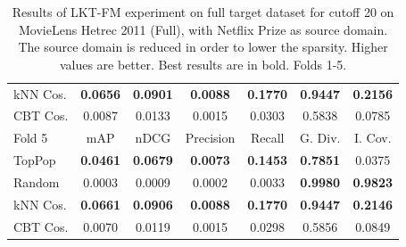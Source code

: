 \begin{table}[hbt]
\begin{tabulary}{\textwidth}{|L|CCCCCC|}
kNN Cos. & \textbf{0.0656} & \textbf{0.0901} & \textbf{0.0088} & \textbf{0.1770} & \textbf{0.9447} & \textbf{0.2156} \\
CBT Cos. & 0.0087 & 0.0133 & 0.0015 & 0.0303 & 0.5838 & 0.0785 \\
\hline
\hline
Fold 5 & mAP & nDCG & Precision & Recall & G. Div. & I. Cov. \\
\hline
TopPop & \textbf{0.0461} & \textbf{0.0679} & \textbf{0.0073} & \textbf{0.1453} & \textbf{0.7851} & 0.0375 \\
Random & 0.0003 & 0.0009 & 0.0002 & 0.0033 & \textbf{0.9980} & \textbf{0.9823} \\
kNN Cos. & \textbf{0.0661} & \textbf{0.0906} & \textbf{0.0088} & \textbf{0.1770} & \textbf{0.9447} & \textbf{0.2146} \\
CBT Cos. & 0.0070 & 0.0119 & 0.0015 & 0.0298 & 0.5856 & 0.0849 \\
\hline
\end{tabulary}
\caption{Results of LKT-FM experiment on full target dataset for cutoff 20 on MovieLens Hetrec 2011 (Full), with Netflix Prize as source domain. The source domain is reduced in order to lower the sparsity. Higher values are better. Best results are in bold. Folds 1-5.}
\end{table}

